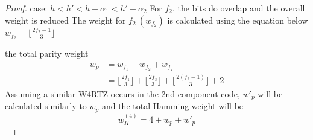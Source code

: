 \begin{proof}{case: $h<h'<h+\alpha_1<h'+\alpha_2$}
For $f_2$, the bits do overlap and the overall weight is reduced
The weight for $f_2~ (w_{f_2})$ is calculated using the equation below
$w_{f_2}=\lfloor \frac{2f_2-1}{3} \rfloor$

the total parity weight 
\begin{equation}
\begin{split}
w_p &= w_{f_1} + w_{f_2} + w_{f_2}\\
&= \lfloor \frac{2f_1}{3} \rfloor + \lfloor \frac{2f_3}{3} \rfloor+\lfloor \frac{2(f_2-1)}{3} \rfloor + 2
\end{split}
\end{equation}
Assuming a similar W4RTZ occurs in the 2nd component code, $w'_p$ will be calculated similarly to $w_p$ and the total Hamming weight will be 
\begin{equation}
w_H^{(4)}=4+w_p+w'_p
\end{equation}
\end{proof}

